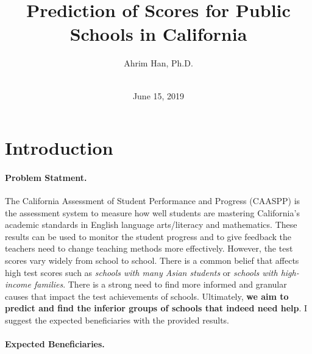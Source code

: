 \documentclass[11pt]{article}
\begin{document}
 



\title{Prediction of Scores for Public Schools in California}

\author
{Ahrim Han, Ph.D.\\
\\
}


\date{June 15, 2019}





\maketitle 
\newpage

\doublespacing
\tableofcontents
\singlespacing
\newpage

\baselineskip24pt

\section{Introduction}

\paragraph*{Problem Statment.}

The California Assessment of Student Performance and Progress (CAASPP) is the assessment system to measure how well students are mastering California's academic standards in English language arts/literacy and mathematics. These results can be used to monitor the student progress and to give feedback the teachers need to change teaching methods more effectively. However, the test scores vary widely from school to school. There is a common belief that affects high test scores such as \textit{schools with many Asian students} or \textit{schools with high-income families}. There is a strong need to find more informed and granular causes that impact the test achievements of schools. 
%
Ultimately, \textbf{we aim to predict and find the inferior groups of schools that indeed need help}. I suggest the expected beneficiaries with the provided results.

\paragraph*{Expected Beneficiaries.}
\end{document}
